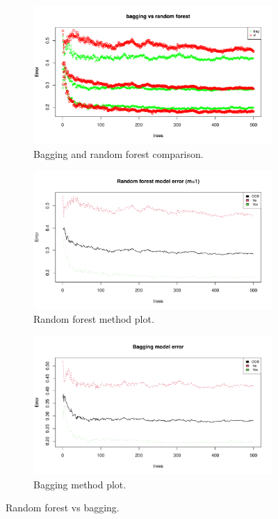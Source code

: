 \begin{figure}[H]
	\centering
	\begin{subfigure}{.3\textwidth}
		\centering
		\includegraphics[width=\linewidth]{ImageFiles/Classification/Trees/vs_bagg_for_500_plot.pdf}
		\caption{Bagging and random forest comparison.}
		\label{fig:vs_bagg_for_500_plot}
	\end{subfigure}%
	\hfill
	\begin{subfigure}{.3\textwidth}
		\centering
		\includegraphics[width=\linewidth]{ImageFiles/Classification/Trees/best_for_500_plot.pdf}
		\caption{Random forest method plot.}
		\label{fig:best_for_500_plot}
	\end{subfigure}%
	\hfill
	\begin{subfigure}{.3\textwidth}
		\centering
		\includegraphics[width=\linewidth]{ImageFiles/Classification/Trees/bagg_500_plot.pdf}
		\caption{Bagging method plot.}
		\label{fig:bagg_500_plot}
	\end{subfigure}
	\caption{Random forest vs bagging.}
	\label{fig:RFvsB}
\end{figure}

